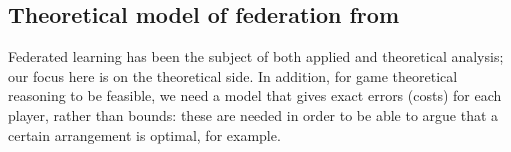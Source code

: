 \documentclass{article}
\begin{document}



\subsection{Theoretical model of federation from \cite{donahue2020model}}

Federated learning has been the subject of both applied and theoretical analysis; our focus here is on the theoretical side. 
In addition, for game theoretical reasoning to be feasible, we need a model that gives exact errors (costs) for each player, rather than bounds: these are needed in order to be able to argue that a certain arrangement is optimal, for example. 


\end{document}
